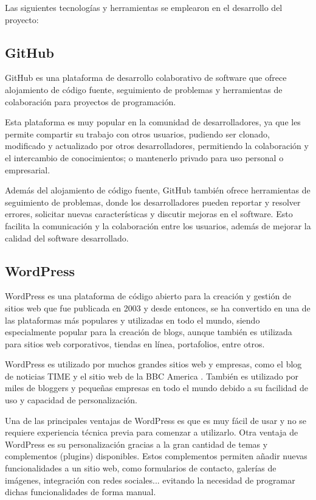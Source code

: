         Las siguientes tecnologías y herramientas se emplearon en el desarrollo del proyecto:
        
        \subsection{GitHub}
        
            GitHub es una plataforma de desarrollo colaborativo de software que ofrece alojamiento de código fuente, seguimiento de problemas y herramientas de colaboración para proyectos de programación.
            
            Esta plataforma es muy popular en la comunidad de desarrolladores, ya que les permite compartir su trabajo con otros usuarios, pudiendo ser clonado, modificado y actualizado por otros desarrolladores, permitiendo la colaboración y el intercambio de conocimientos; o mantenerlo privado para uso personal o empresarial.
            
            Además del alojamiento de código fuente, GitHub también ofrece herramientas de seguimiento de problemas, donde los desarrolladores pueden reportar y resolver errores, solicitar nuevas características y discutir mejoras en el software. Esto facilita la comunicación y la colaboración entre los usuarios, además de mejorar la calidad del software desarrollado.
            
            
        \subsection{WordPress}
            
            WordPress \cite{wordpress} es una plataforma de código abierto para la creación y gestión de sitios web que fue publicada en 2003 y desde entonces, se ha convertido en una de las plataformas más populares y utilizadas en todo el mundo, siendo especialmente popular para la creación de blogs, aunque también es utilizada para sitios web corporativos, tiendas en línea, portafolios, entre otros. 
            
            WordPress es utilizado por muchos grandes sitios web y empresas, como el blog de noticias TIME \cite{time-web} y el sitio web de la BBC America \cite{bbc-america-web}. También es utilizado por miles de bloggers y pequeñas empresas en todo el mundo debido a su facilidad de uso y capacidad de personalización.

            Una de las principales ventajas de WordPress es que es muy fácil de usar y no se requiere experiencia técnica previa para comenzar a utilizarlo. Otra ventaja de WordPress es su personalización gracias a la gran cantidad de temas y complementos (plugins) disponibles. Estos complementos permiten añadir nuevas funcionalidades a un sitio web, como formularios de contacto, galerías de imágenes, integración con redes sociales... evitando la necesidad de programar dichas funcionalidades de forma manual.
            
